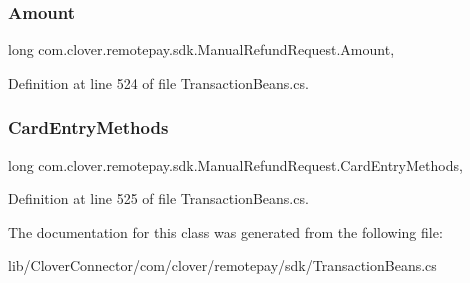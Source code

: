 \subsubsection{\texorpdfstring{Amount}{Amount}}
{\footnotesize\ttfamily long com.\+clover.\+remotepay.\+sdk.\+Manual\+Refund\+Request.\+Amount\hspace{0.3cm}{\ttfamily [get]}, {\ttfamily [set]}}



Definition at line 524 of file Transaction\+Beans.\+cs.

\mbox{\label{classcom_1_1clover_1_1remotepay_1_1sdk_1_1_manual_refund_request_a9e34fc487579d6f6b68b0e3017e9a829}} 
\subsubsection{\texorpdfstring{Card\+Entry\+Methods}{CardEntryMethods}}
{\footnotesize\ttfamily long com.\+clover.\+remotepay.\+sdk.\+Manual\+Refund\+Request.\+Card\+Entry\+Methods\hspace{0.3cm}{\ttfamily [get]}, {\ttfamily [set]}}



Definition at line 525 of file Transaction\+Beans.\+cs.



The documentation for this class was generated from the following file\+:\begin{DoxyCompactItemize}
\item 
lib/\+Clover\+Connector/com/clover/remotepay/sdk/Transaction\+Beans.\+cs\end{DoxyCompactItemize}
